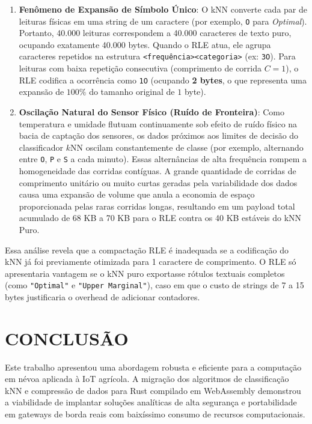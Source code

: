 \documentclass[
	12pt,
	openright,
	oneside,
	a4paper,
	english,
	brazil
	]{abntex2}
\begin{document}
\begin{enumerate}
    \item \textbf{Fenômeno de Expansão de Símbolo Único}:
    O kNN converte cada par de leituras físicas em uma string de um caractere (por exemplo, \texttt{O} para \textit{Optimal}). Portanto, 40.000 leituras correspondem a 40.000 caracteres de texto puro, ocupando exatamente 40.000 bytes.
    Quando o RLE atua, ele agrupa caracteres repetidos na estrutura \texttt{<frequência><categoria>} (ex: \texttt{3O}). Para leituras com baixa repetição consecutiva (comprimento de corrida $C = 1$), o RLE codifica a ocorrência como \texttt{1O} (ocupando \textbf{2 bytes}, o que representa uma expansão de $100\%$ do tamanho original de $1$ byte).
    
    \item \textbf{Oscilação Natural do Sensor Físico (Ruído de Fronteira)}:
    Como temperatura e umidade flutuam continuamente sob efeito de ruído físico na bacia de captação dos sensores, os dados próximos aos limites de decisão do classificador $k$NN oscilam constantemente de classe (por exemplo, alternando entre \texttt{O}, \texttt{P} e \texttt{S} a cada minuto). Essas alternâncias de alta frequência rompem a homogeneidade das corridas contíguas. 
    A grande quantidade de corridas de comprimento unitário ou muito curtas geradas pela variabilidade dos dados causa uma expansão de volume que anula a economia de espaço proporcionada pelas raras corridas longas, resultando em um payload total acumulado de 68 KB a 70 KB para o RLE contra os 40 KB estáveis do kNN Puro.
\end{enumerate}

Essa análise revela que a compactação RLE é inadequada se a codificação do kNN já foi previamente otimizada para 1 caractere de comprimento. O RLE só apresentaria vantagem se o kNN puro exportasse rótulos textuais completos (como \texttt{"Optimal"} e \texttt{"Upper Marginal"}), caso em que o custo de strings de 7 a 15 bytes justificaria o overhead de adicionar contadores.

\chapter{CONCLUSÃO}
\label{cap:conclusao}

Este trabalho apresentou uma abordagem robusta e eficiente para a computação em névoa aplicada à IoT agrícola. A migração dos algoritmos de classificação kNN e compressão de dados para Rust compilado em WebAssembly demonstrou a viabilidade de implantar soluções analíticas de alta segurança e portabilidade em gateways de borda reais com baixíssimo consumo de recursos computacionais.
\end{document}
